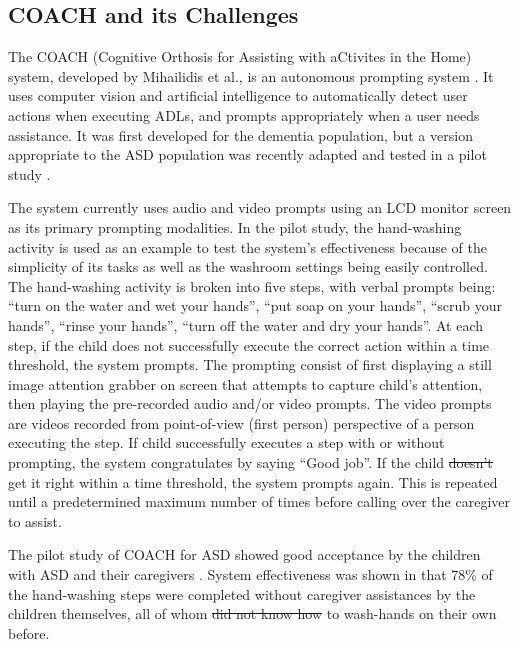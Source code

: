 \documentclass{ut-thesis}
\providecommand{\DIFaddtex}[1]{{\protect\color{blue}\uwave{#1}}} %
\providecommand{\DIFdeltex}[1]{{\protect\color{red}\sout{#1}}}                      %
\providecommand{\DIFaddbegin}{} %
\providecommand{\DIFaddend}{} %
\providecommand{\DIFdelbegin}{} %
\providecommand{\DIFdelend}{} %
\providecommand{\DIFadd}[1]{\texorpdfstring{\DIFaddtex{#1}}{#1}} %
\providecommand{\DIFdel}[1]{\texorpdfstring{\DIFdeltex{#1}}{}} %
\begin{document}
\subsection{COACH and its Challenges}

The COACH (Cognitive Orthosis for Assisting with aCtivites in the Home) system, developed by Mihailidis et al., is an autonomous prompting system \cite{mihailidis2008coach}.  It uses computer vision and artificial intelligence to automatically detect user actions when executing ADLs, and prompts appropriately when a user needs assistance.  It was first developed for the dementia population, but a version appropriate to the ASD population was recently adapted and tested in a pilot study \cite{bimbrahw2012investigating}.


The system currently uses audio and video prompts using an LCD monitor screen as its primary prompting modalities.  In the pilot study, the hand-washing activity is used as an example to test the system's effectiveness because of the simplicity of its tasks as well as the washroom settings being easily controlled.  The hand-washing activity is broken into five steps, with verbal prompts being: ``turn on the water and wet your hands'', ``put soap on your hands'', ``scrub your hands'', ``rinse your hands'', ``turn off the water and dry your hands''.  At each step, if the child does not successfully execute the correct action within a time threshold, the system prompts.  The prompting consist of first displaying a still image attention grabber on screen that attempts to capture child's attention, then playing the pre-recorded audio and/or video prompts.  The video prompts are videos recorded from point-of-view (first person) perspective of a person executing the step.  If child successfully executes a step with or without prompting, the system congratulates by saying ``Good job''.  If the child \DIFdelbegin \DIFdel{doesn't }\DIFdelend \DIFaddbegin \DIFadd{does not }\DIFaddend get it right within a time threshold, the system prompts again.  This is repeated until a predetermined maximum number of times before calling over the caregiver to assist.  


The pilot study of COACH for ASD showed good acceptance by the children with ASD and their caregivers \cite{bimbrahw2012investigating}.  System effectiveness was shown in that 78\% of the hand-washing steps were completed without caregiver assistances by the children themselves, all of whom \DIFdelbegin \DIFdel{did not know how }\DIFdelend \DIFaddbegin \DIFadd{were unable }\DIFaddend to wash-hands on their own before.
\end{document}
